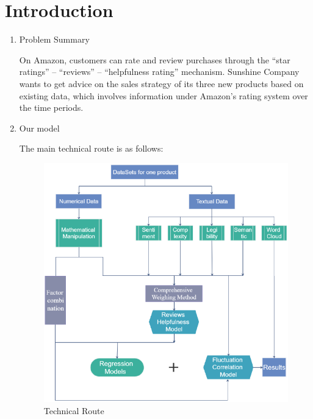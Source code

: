 \documentclass{mcmthesis}
\begin{document}
\clearpage

\section{Introduction}
\begin{enumerate}
\item Problem Summary

\quad \quad On Amazon, customers can rate and review purchases through the “star ratings” – “reviews” –  “helpfulness rating” mechanism. Sunshine Company wants to  get advice on the sales strategy of its three new products based on existing data, which involves information under Amazon's rating system over the time periods.
\item Our model

\quad \quad The main technical route is as follows:

\begin{figure}[H]
\centering
\includegraphics[width=\textwidth]{figures/r.png}
\caption{Technical Route}
\end{figure}
\end{enumerate}
\end{document}
